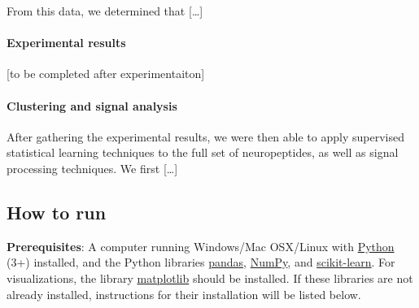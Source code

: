 \documentclass[]{article}
\let\oldparagraph\paragraph
\renewcommand{\paragraph}[1]{\oldparagraph{#1}\mbox{}}
\begin{document}
From this data, we determined that {[}\ldots{}{]}

\hypertarget{experimental-results-1}{%
\paragraph{Experimental results}\label{experimental-results-1}}

{[}to be completed after experimentaiton{]}

\hypertarget{clustering-and-signal-analysis}{%
\paragraph{Clustering and signal
analysis}\label{clustering-and-signal-analysis}}

After gathering the experimental results, we were then able to apply
supervised statistical learning techniques to the full set of
neuropeptides, as well as signal processing techniques. We first
{[}\ldots{}{]}

\hypertarget{how-to-run}{%
\subsection{How to run}\label{how-to-run}}

\textbf{Prerequisites}: A computer running Windows/Mac OSX/Linux with
\href{https://www.python.org/}{Python} (3+) installed, and the Python
libraries \href{https://pandas.pydata.org/}{pandas},
\href{https://numpy.org/}{NumPy}, and
\href{https://scikit-learn.org/stable/}{scikit-learn}. For
visualizations, the library \href{https://matplotlib.org/}{matplotlib}
should be installed. If these libraries are not already installed,
instructions for their installation will be listed below.
\end{document}
